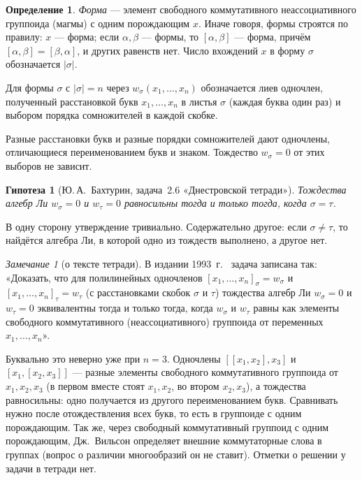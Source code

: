 \documentclass[11pt]{article}
\theoremstyle{plain}
\newtheorem*{conjecture}{Гипотеза}
\theoremstyle{definition}
\newtheorem{definition}[theorem]{Определение}
\theoremstyle{remark}
\newtheorem{remark}[theorem]{Замечание}
\begin{document}
\begin{definition}
\emph{Форма} --- элемент свободного коммутативного неассоциативного группоида (магмы) с одним порождающим $x$. Иначе говоря, формы строятся по правилу: $x$ --- форма; если $\alpha,\beta$ --- формы, то $[\alpha,\beta]$ --- форма, причём $[\alpha,\beta]=[\beta,\alpha]$, и других равенств нет. Число вхождений $x$ в форму $\sigma$ обозначается $|\sigma|$.

Для формы $\sigma$ с $|\sigma|=n$ через $w_\sigma(x_1,\dots,x_n)$ обозначается лиев одночлен, полученный расстановкой букв $x_1,\dots,x_n$ в листья $\sigma$ (каждая буква один раз) и выбором порядка сомножителей в каждой скобке.
\end{definition}

Разные расстановки букв и разные порядки сомножителей дают одночлены, отличающиеся переименованием букв и знаком. Тождество $w_\sigma=0$ от этих выборов не зависит.

\begin{conjecture}[Ю.\,А.~Бахтурин, задача~2.6 «Днестровской тетради»]
Тождества алгебр Ли $w_\sigma=0$ и $w_\tau=0$ равносильны тогда и только тогда, когда $\sigma=\tau$.
\end{conjecture}

В одну сторону утверждение тривиально. Содержательно другое: если $\sigma\ne\tau$, то найдётся алгебра Ли, в которой одно из тождеств выполнено, а другое нет.

\begin{remark}[о тексте тетради]\label{rem:text}
В издании 1993~г.\ \cite{DN} задача записана так: «Доказать, что для полилинейных одночленов $[x_1,\dots,x_n]_\sigma=w_\sigma$ и $[x_1,\dots,x_n]_\tau=w_\tau$ (с расстановками скобок $\sigma$ и $\tau$) тождества алгебр Ли $w_\sigma=0$ и $w_\tau=0$ эквивалентны тогда и только тогда, когда $w_\sigma$ и $w_\tau$ равны как элементы свободного коммутативного (неассоциативного) группоида от переменных $x_1,\dots,x_n$».

Буквально это неверно уже при $n=3$. Одночлены $[[x_1,x_2],x_3]$ и $[x_1,[x_2,x_3]]$ --- разные элементы свободного коммутативного группоида от $x_1,x_2,x_3$ (в первом вместе стоят $x_1,x_2$, во втором $x_2,x_3$), а тождества равносильны: одно получается из другого переименованием букв. Сравнивать нужно после отождествления всех букв, то есть в группоиде с одним порождающим. Так же, через свободный коммутативный группоид с одним порождающим, Дж.~Вильсон \cite{Wil} определяет внешние коммутаторные слова в группах (вопрос о различии многообразий он не ставит). Отметки о решении у задачи в тетради нет.
\end{remark}
\end{document}
